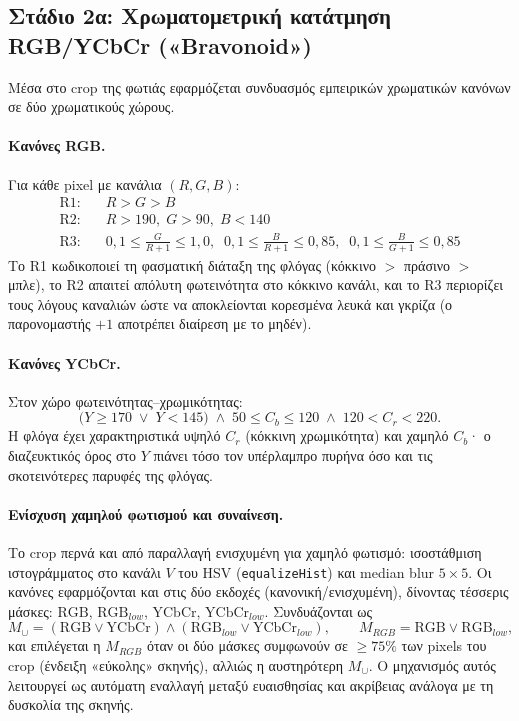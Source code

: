 \documentclass[11pt]{article}
\newcommand{\code}[1]{\texttt{#1}}
\begin{document}
\subsection{Στάδιο 2α: Χρωματομετρική κατάτμηση RGB/YCbCr («Bravonoid»)}

Μέσα στο crop της φωτιάς εφαρμόζεται συνδυασμός εμπειρικών χρωματικών
κανόνων σε δύο χρωματικούς χώρους.

\paragraph{Κανόνες RGB.} Για κάθε pixel με κανάλια $(R,G,B)$:
\begin{align*}
  \text{R1:}\quad & R > G > B \\
  \text{R2:}\quad & R > 190,\; G > 90,\; B < 140 \\
  \text{R3:}\quad & 0{,}1 \le \tfrac{G}{R+1} \le 1{,}0,\;\;
                    0{,}1 \le \tfrac{B}{R+1} \le 0{,}85,\;\;
                    0{,}1 \le \tfrac{B}{G+1} \le 0{,}85
\end{align*}
Το R1 κωδικοποιεί τη φασματική διάταξη της φλόγας (κόκκινο $>$ πράσινο $>$
μπλε), το R2 απαιτεί απόλυτη φωτεινότητα στο κόκκινο κανάλι, και το R3
περιορίζει τους λόγους καναλιών ώστε να αποκλείονται κορεσμένα λευκά και
γκρίζα (ο παρονομαστής $+1$ αποτρέπει διαίρεση με το μηδέν).

\paragraph{Κανόνες YCbCr.} Στον χώρο φωτεινότητας--χρωμικότητας:
\[
  \bigl(Y \ge 170 \;\lor\; Y < 145\bigr) \;\land\;
  50 \le C_b \le 120 \;\land\; 120 < C_r < 220 .
\]
Η φλόγα έχει χαρακτηριστικά υψηλό $C_r$ (κόκκινη χρωμικότητα) και χαμηλό
$C_b$· ο διαζευκτικός όρος στο $Y$ πιάνει τόσο τον υπέρλαμπρο πυρήνα όσο
και τις σκοτεινότερες παρυφές της φλόγας.

\paragraph{Ενίσχυση χαμηλού φωτισμού και συναίνεση.} Το crop περνά και από
παραλλαγή ενισχυμένη για χαμηλό φωτισμό: ισοστάθμιση ιστογράμματος στο
κανάλι $V$ του HSV (\code{equalizeHist}) και median blur $5\times5$. Οι
κανόνες εφαρμόζονται και στις δύο εκδοχές (κανονική/ενισχυμένη), δίνοντας
τέσσερις μάσκες: $\mathrm{RGB}$, $\mathrm{RGB}_{low}$, $\mathrm{YCbCr}$,
$\mathrm{YCbCr}_{low}$. Συνδυάζονται ως
\[
  M_{\cup} = (\mathrm{RGB}\lor \mathrm{YCbCr}) \land
             (\mathrm{RGB}_{low}\lor \mathrm{YCbCr}_{low}),
  \qquad
  M_{RGB} = \mathrm{RGB}\lor \mathrm{RGB}_{low},
\]
και επιλέγεται η $M_{RGB}$ όταν οι δύο μάσκες συμφωνούν σε $\ge 75\%$ των
pixels του crop (ένδειξη «εύκολης» σκηνής), αλλιώς η αυστηρότερη
$M_{\cup}$. Ο μηχανισμός αυτός λειτουργεί ως αυτόματη εναλλαγή μεταξύ
ευαισθησίας και ακρίβειας ανάλογα με τη δυσκολία της σκηνής.
\end{document}
